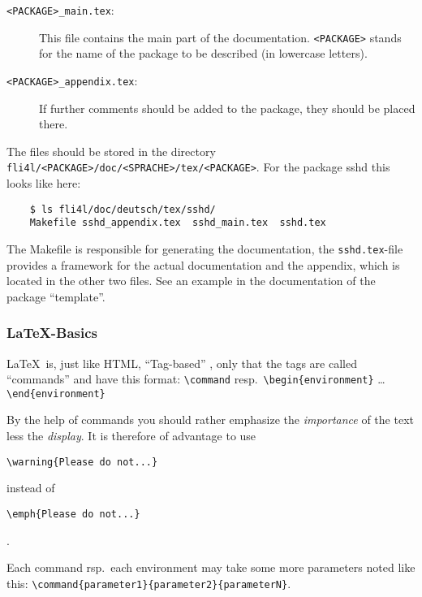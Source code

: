 \begin{description}
\item [\texttt{<PACKAGE>\_main.tex}:] This file contains the main
  part of the documentation. \texttt{<PACKAGE>} stands for the name of the
  package to be described (in lowercase letters).
\item[\texttt{<PACKAGE>\_appendix.tex}:] If further comments should be
  added to the package, they should be placed there.
\end{description}

The files should be stored in the directory
\texttt{fli4l/<PACKAGE>/doc/<SPRACHE>/tex/<PACKAGE>}.
For the package sshd this looks like here:

\begin{verbatim}
    $ ls fli4l/doc/deutsch/tex/sshd/
    Makefile sshd_appendix.tex  sshd_main.tex  sshd.tex
\end{verbatim}

The Makefile is responsible for generating the documentation,
the \texttt{sshd.tex}-file provides a framework for the actual
documentation and the appendix, which is located in the other
two files. See an example in the documentation of the package
``template''.

\subsubsection{\LaTeX-Basics}

\LaTeX\ is, just like HTML, ``Tag-based'' , only that the tags
are called ``commands'' and have this format: \verb*?\command?
resp.\ \verb*?\begin{environment}? \ldots \verb*?\end{environment}?

By the help of commands you should rather emphasize the \emph{importance}
of the text less the \emph{display}. It is therefore of advantage to use

\begin{example}
\verb*?\warning{Please do not...}?
\end{example}

\noindent instead of

\begin{example}
\verb*?\emph{Please do not...}?
\end{example}

\noindent.

Each command rsp.\ each environment may take some more parameters
noted like this: \verb*?\command{parameter1}{parameter2}{parameterN}?.

